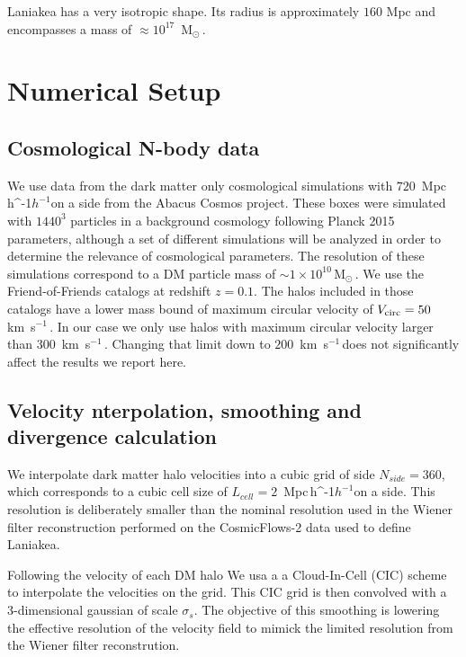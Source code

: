 \documentclass[usenatbib]{mnras}
\newcommand{\Msun}{\,{\rm M}$_{\odot}$\,}
\newcommand{\Mpch}{\,{\rm Mpc}\,\ifmmode h^{-1}\else $h^{-1}$\fi}
\newcommand{\kms}{\,{\rm km}\ s$^{-1}$\,}
\begin{document}
Laniakea has a very isotropic shape. 
Its radius is approximately $160$ Mpc and encompasses a mass of
$\approx 10^{17}$ \Msun.



\section{Numerical Setup}

\subsection{Cosmological N-body data}

We use data from the dark matter only cosmological simulations with
$720$ \Mpch on a side from the Abacus Cosmos project.  
These boxes were simulated with $1440^3$ particles in a background
cosmology following Planck 2015 parameters, although a set of
different simulations will be analyzed in order to determine the
relevance of cosmological parameters.
The resolution of these simulations correspond to a DM particle mass
of $\sim 1 \times 10^{10}$\Msun.
We use the Friend-of-Friends catalogs at redshift $z=0.1$.
The halos included in those catalogs have a lower mass bound of 
maximum circular velocity of $V_{\rm circ}=50$ \kms.
In our case we only use halos with maximum circular velocity larger
than $300$ \kms.
Changing that limit down to $200$ \kms does not significantly affect
the results we report here.

\subsection{Velocity nterpolation, smoothing and divergence calculation}  

We interpolate dark matter halo velocities into a cubic grid of side
$N_{side}=360$, which corresponds to a cubic cell size of $L_{cell}=2$
\Mpch on a side.
This resolution is deliberately smaller than the nominal resolution
used in the Wiener filter reconstruction performed on the
CosmicFlows-2 data used to define Laniakea.

Following \cite{2014Natur.513...71T} the velocity of each DM halo 
We usa a a Cloud-In-Cell (CIC) scheme to interpolate the velocities on
the grid.
This CIC grid is then convolved with a 3-dimensional gaussian of
scale $\sigma_s$. 
The objective of this smoothing is lowering the effective resolution
of the velocity field to mimick the limited resolution from the Wiener
filter reconstrution.
\end{document}
